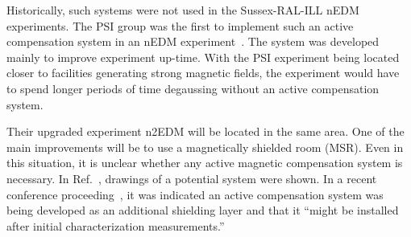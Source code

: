 Historically, such systems were not used in the Sussex-RAL-ILL nEDM experiments.
The PSI group was the first to implement such an active compensation system in an nEDM experiment~\cite{bea_paper}. The system was developed mainly to improve experiment up-time. With the PSI experiment being located closer to facilities generating strong magnetic fields, the experiment would have to spend longer periods of time degaussing without an active compensation system.

Their upgraded experiment n2EDM will be located in the same area. One of the main improvements will be to use a magnetically shielded room (MSR). Even in this situation, it is unclear whether any active magnetic compensation system is necessary.  %
In Ref.~\cite{rawlik}, drawings of a potential system were shown. In a recent conference proceeding~\cite{psi_n2edm_PPNS-workshop}, it was indicated an active compensation system was being developed as an additional shielding layer and that it ``might be installed after initial characterization measurements.'' 





